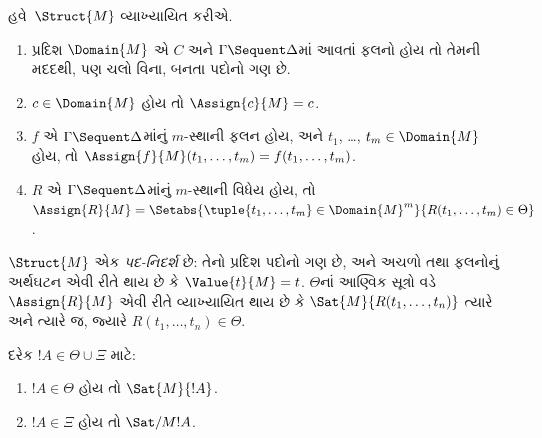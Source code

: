 હવે~$\Struct{M}$
વ્યાખ્યાયિત કરીએ.
\begin{enumerate}
\item પ્રદિશ
$\Domain{M}$ એ
$C$ અને
$\Gamma \Sequent \Delta$માં
આવતાં
ફલનો
હોય તો તેમની
મદદથી, પણ
ચલો વિના,
બનતા પદોનો
ગણ છે.
\item $c \in \Domain{M}$
હોય તો
$\Assign{c}{M} = c$.
\item $f$ એ
$\Gamma \Sequent \Delta$માંનું
$m$-સ્થાની
ફલન
હોય, અને
$t_1$,
\dots,
$t_m \in \Domain{M}$
હોય, તો
$\Assign{f}{M}(t_1, \dots, t_m) =
f(t_1, \dots, t_m)$.
\item $R$ એ
$\Gamma \Sequent
\Delta$માંનું
$m$-સ્થાની
વિધેય
હોય, તો
$\Assign{R}{M} = \Setabs{\tuple{t_1, \dots, t_m} \in
\Domain{M}^m}{R(t_1, \dots, t_m) \in \Theta}$.
\end{enumerate}
$\Struct{M}$ એક
\emph{પદ-નિદર્શ}
છે: તેનો પ્રદિશ
પદોનો ગણ છે,
અને
અચળો તથા
ફલનોનું
અર્થઘટન એવી
રીતે થાય છે
કે
$\Value{t}{M} = t$.
$\Theta$નાં
આણ્વિક
સૂત્રો
વડે
$\Assign{R}{M}$
એવી રીતે
વ્યાખ્યાયિત
થાય છે કે
$\Sat{M}{R(t_1, \dots, t_n)}$
ત્યારે અને
ત્યારે જ,
જ્યારે
$R(t_1, \dots, t_n)
\in \Theta$.

\begin{lem}
દરેક
$!A \in \Theta \cup \Xi$
માટે:
\begin{enumerate}
  \item $!A \in \Theta$
  હોય તો
  $\Sat{M}{!A}$.
  \item $!A \in \Xi$
  હોય તો
  $\Sat/{M}{!A}$.
\end{enumerate}
\end{lem}

